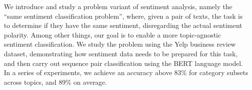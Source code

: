 We introduce and study a problem variant of sentiment analysis, namely the ``same sentiment classification problem'', where, given a pair of texts, the task is to determine if they have the same sentiment, disregarding the actual sentiment polarity. Among other things, our goal is to enable a more topic-agnostic sentiment classification. We study the problem using the Yelp business review dataset, demonstrating how sentiment data needs to be prepared for this task, and then carry out sequence pair classification using the BERT language model. In a series of experiments, we achieve an accuracy above 83\% for category subsets across topics, and 89\% on average.

